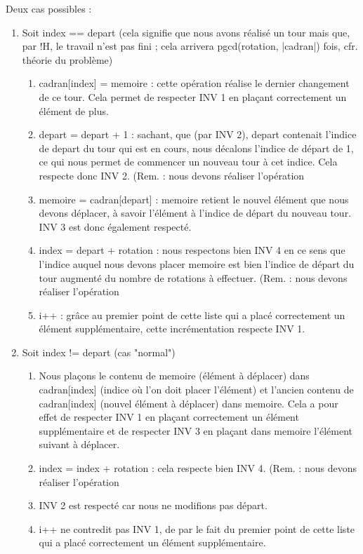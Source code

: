 \documentclass[a4paper, 12pt]{report}
\begin{document}
Deux cas possibles :
\begin{enumerate}
\item Soit index == depart (cela signifie que nous avons réalisé un tour mais que, par !H, le travail n'est pas fini ; cela arrivera pgcd(rotation, |cadran|) fois, cfr. théorie du problème)
\begin{enumerate}

\item cadran[index] = memoire : cette opération réalise le dernier changement de ce tour. Cela permet de respecter INV 1 en plaçant correctement un élément de plus.
\item depart = depart + 1 : sachant, que (par INV 2), depart contenait l'indice de depart du tour qui est en cours, nous décalons l'indice de départ de 1, ce qui nous permet de commencer un nouveau tour à cet indice. Cela respecte donc INV 2. (Rem. : nous devons réaliser l'opération %
\item memoire = cadran[depart] : memoire retient le nouvel élément que nous devons déplacer, à savoir l'élément à l'indice de départ du nouveau tour. INV 3 est donc également respecté.
\item index = depart + rotation : nous respectons bien INV 4 en ce sens que l'indice auquel nous devons placer memoire est bien l'indice de départ du tour augmenté du nombre de rotations à effectuer. (Rem. : nous devons réaliser l'opération %
\item i++ : grâce au premier point de cette liste qui a placé correctement un élément supplémentaire, cette incrémentation respecte INV 1.
\end{enumerate}
\item Soit index != depart (cas "normal")
\begin{enumerate}
\item Nous plaçons le contenu de memoire (élément à déplacer) dans cadran[index] (indice où l'on doit placer l'élément) et l'ancien contenu de cadran[index] (nouvel élément à déplacer) dans memoire. Cela a pour effet de respecter INV 1 en plaçant correctement un élément supplémentaire et de respecter INV 3 en plaçant dans memoire l'élément suivant à déplacer.
\item index = index + rotation : cela respecte bien INV 4. (Rem. : nous devons réaliser l'opération %
\item INV 2 est respecté car nous ne modifions pas départ.
\item i++ ne contredit pas INV 1, de par le fait du premier point de cette liste qui a placé correctement un élément supplémentaire.
\end{enumerate}
\end{enumerate}
\end{document}
